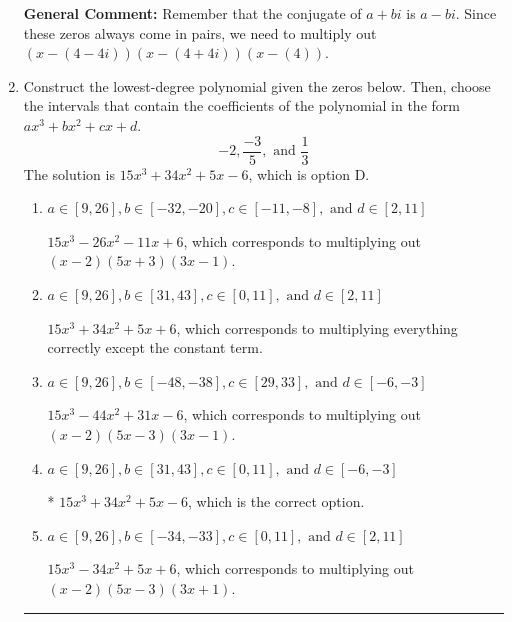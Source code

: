 \documentclass{extbook}[14pt]
\newcommand{\litem}[1]{\item #1

\rule{\textwidth}{0.4pt}}
\begin{document}
\begin{enumerate}
{\textbf{General Comment:} Remember that the conjugate of $a+bi$ is $a-bi$. Since these zeros always come in pairs, we need to multiply out $(x-(4 - 4 i))(x-(4 + 4 i))(x-(4))$.
}
\litem{
Construct the lowest-degree polynomial given the zeros below. Then, choose the intervals that contain the coefficients of the polynomial in the form $ax^3+bx^2+cx+d$.
\[ -2, \frac{-3}{5}, \text{ and } \frac{1}{3} \]The solution is \( 15x^{3} +34 x^{2} +5 x -6 \), which is option D.\begin{enumerate}[label=\Alph*.]
\item \( a \in [9, 26], b \in [-32, -20], c \in [-11, -8], \text{ and } d \in [2, 11] \)

$15x^{3} -26 x^{2} -11 x + 6$, which corresponds to multiplying out $(x -2)(5x + 3)(3x -1)$.
\item \( a \in [9, 26], b \in [31, 43], c \in [0, 11], \text{ and } d \in [2, 11] \)

$15x^{3} +34 x^{2} +5 x + 6$, which corresponds to multiplying everything correctly except the constant term.
\item \( a \in [9, 26], b \in [-48, -38], c \in [29, 33], \text{ and } d \in [-6, -3] \)

$15x^{3} -44 x^{2} +31 x -6$, which corresponds to multiplying out $(x -2)(5x -3)(3x -1)$.
\item \( a \in [9, 26], b \in [31, 43], c \in [0, 11], \text{ and } d \in [-6, -3] \)

* $15x^{3} +34 x^{2} +5 x -6$, which is the correct option.
\item \( a \in [9, 26], b \in [-34, -33], c \in [0, 11], \text{ and } d \in [2, 11] \)

$15x^{3} -34 x^{2} +5 x + 6$, which corresponds to multiplying out $(x -2)(5x -3)(3x + 1)$.
\end{enumerate}

}
\end{enumerate}
\end{document}
